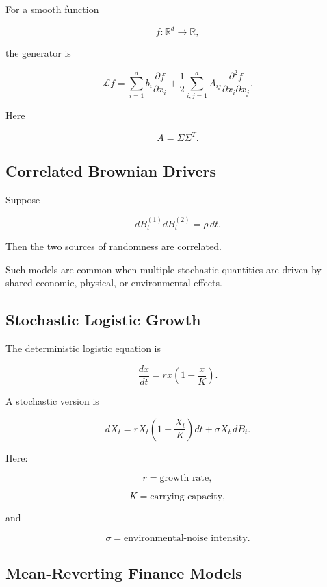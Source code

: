 For a smooth function

\[
f:\mathbb{R}^d\to\mathbb{R},
\]

the generator is

\[
\boxed{
\mathcal{L}f
=
\sum_{i=1}^{d}
b_i
\frac{\partial f}{\partial x_i}
+
\frac12
\sum_{i,j=1}^{d}
A_{ij}
\frac{\partial^2 f}
{\partial x_i\partial x_j}.
}
\]

Here

\[
A
=
\Sigma\Sigma^T.
\]

\subsection{Correlated Brownian Drivers}
\label{subsec:correlated-brownian-drivers}

Suppose

\[
dB_t^{(1)}dB_t^{(2)}
=
\rho\,dt.
\]

Then the two sources of randomness are correlated.

Such models are common when multiple stochastic quantities are driven by
shared economic, physical, or environmental effects.

\subsection{Stochastic Logistic Growth}
\label{subsec:stochastic-logistic-growth}

The deterministic logistic equation is

\[
\frac{dx}{dt}
=
rx
\left(
1-\frac{x}{K}
\right).
\]

A stochastic version is

\[
\boxed{
dX_t
=
rX_t
\left(
1-\frac{X_t}{K}
\right)dt
+
\sigma X_t\,dB_t.
}
\]

Here:

\[
r
=
\text{growth rate},
\]

\[
K
=
\text{carrying capacity},
\]

and

\[
\sigma
=
\text{environmental-noise intensity}.
\]

\subsection{Mean-Reverting Finance Models}
\label{subsec:mean-reverting-finance-sdes}

